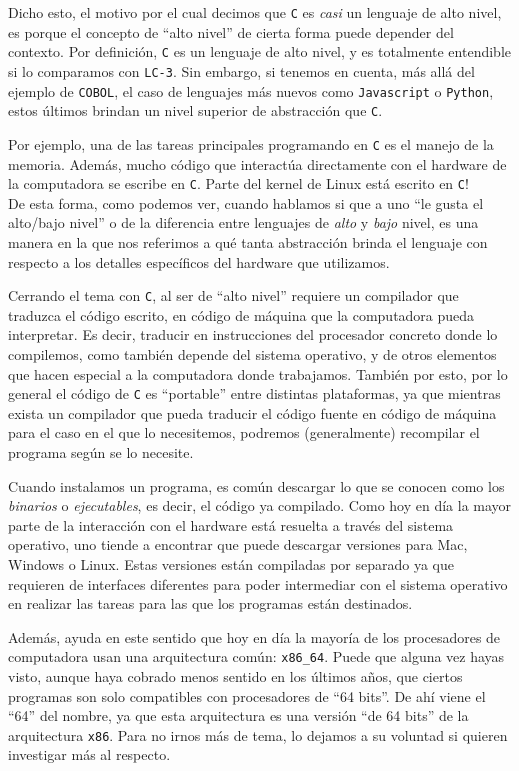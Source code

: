\documentclass[a4paper, titlepage]{report}
\begin{document}
	Dicho esto, el motivo por el cual decimos que \texttt{C} es \textit{casi} un lenguaje de alto nivel, es porque el concepto de ``alto nivel'' de cierta forma puede depender del contexto. Por definición, \texttt{C} es un lenguaje de alto nivel, y es totalmente entendible si lo comparamos con \texttt{LC-3}. Sin embargo, si tenemos en cuenta, más allá del ejemplo de \texttt{COBOL}, el caso de lenguajes más nuevos como \texttt{Javascript} o \texttt{Python}, estos últimos brindan un nivel superior de abstracción que \texttt{C}.
	
	Por ejemplo, una de las tareas principales programando en \texttt{C} es el manejo de la memoria. Además, mucho código que interactúa directamente con el hardware de la computadora se escribe en \texttt{C}. Parte del kernel de Linux está escrito en \texttt{C}!\\
	
	De esta forma, como podemos ver, cuando hablamos si que a uno ``le gusta el alto/bajo nivel'' o de la diferencia entre lenguajes de \textit{alto} y \textit{bajo} nivel, es una manera en la que nos referimos a qué tanta abstracción brinda el lenguaje con respecto a los detalles específicos del hardware que utilizamos.
	
	Cerrando el tema con \texttt{C}, al ser de ``alto nivel'' requiere un compilador que traduzca el código escrito, en código de máquina que la computadora pueda interpretar. Es decir, traducir en instrucciones del procesador concreto donde lo compilemos, como también depende del sistema operativo, y de otros elementos que hacen especial a la computadora donde trabajamos. También por esto, por lo general el código de \texttt{C} es ``portable'' entre distintas plataformas, ya que mientras exista un compilador que pueda traducir el código fuente en código de máquina para el caso en el que lo necesitemos, podremos (generalmente) recompilar el programa según se lo necesite.
	
	Cuando instalamos un programa, es común descargar lo que se conocen como los \textit{binarios} o \textit{ejecutables}, es decir, el código ya compilado. Como hoy en día la mayor parte de la interacción con el hardware está resuelta a través del sistema operativo, uno tiende a encontrar que puede descargar versiones para Mac, Windows o Linux. Estas versiones están compiladas por separado ya que requieren de interfaces diferentes para poder intermediar con el sistema operativo en realizar las tareas para las que los programas están destinados.
	
	Además, ayuda en este sentido que hoy en día la mayoría de los procesadores de computadora usan una arquitectura común: \texttt{x86\_64}. Puede que alguna vez hayas visto, aunque haya cobrado menos sentido en los últimos años, que ciertos programas son solo compatibles con procesadores de ``64 bits''.  De ahí viene el ``64'' del nombre, ya que esta arquitectura es una versión ``de 64 bits'' de la arquitectura \texttt{x86}. Para no irnos más de tema, lo dejamos a su voluntad si quieren investigar más al respecto.
	
\end{document}
